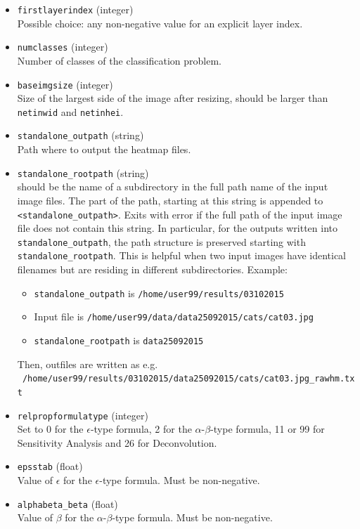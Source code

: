 \documentclass[a4wide]{article}
\begin{document}
\begin{itemize}
 \item \texttt{firstlayerindex} (integer) \\
Possible choice: any non-negative value for an explicit layer index.

\item \texttt{numclasses} (integer) \\
Number of classes of the classification problem.

\item \texttt{baseimgsize} (integer)  \\
Size of the largest side of the image after resizing, should be larger than \texttt{netinwid} and \texttt{netinhei}.

\item \texttt{standalone\_outpath} (string) \\
Path where to output the heatmap files.

\item \texttt{standalone\_rootpath}  (string) \\
should be the name of a subdirectory in the full path name of the input image files. The part of the path, starting at this string is appended to \texttt{<standalone\_outpath>}. Exits with error if the full path of the input image file does not contain this string. In particular, for the outputs written into \texttt{standalone\_outpath}, the path structure is preserved starting with \texttt{standalone\_rootpath}. This is helpful when two input images have identical filenames but are residing in different subdirectories. Example: 
\begin{itemize}
\item \texttt{standalone\_outpath} is \texttt{/home/user99/results/03102015}
\item Input file is \texttt{/home/user99/data/data25092015/cats/cat03.jpg}
\item \texttt{standalone\_rootpath} is \texttt{data25092015}
\end{itemize}
Then, outfiles are written as e.g. \texttt{~/home/user99/results/03102015/data25092015/cats/cat03.jpg\_rawhm.txt}


\item \texttt{relpropformulatype} (integer) \\
Set to 0 for the $\epsilon$-type formula, 2 for the $\alpha$-$\beta$-type formula, 11 or 99 for Sensitivity Analysis and 26 for Deconvolution.

\item \texttt{epsstab} (float) \\
Value of $\epsilon$ for the $\epsilon$-type formula. Must be non-negative.

\item \texttt{alphabeta\_beta} (float) \\
Value of $\beta$ for the $\alpha$-$\beta$-type formula. Must be non-negative.
	

\end{itemize}
\end{document}
